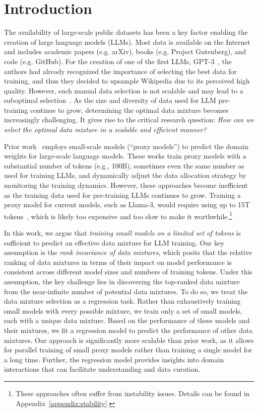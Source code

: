 \section{Introduction}

The availability of large-scale public datasets has been a key factor enabling the creation of large language models (LLMs). Most data is available on the Internet and includes academic papers (e.g. arXiv), books (e.g. Project Gutenberg), and code (e.g. GitHub). For the creation of one of the first LLMs, GPT-3~\citep{gpt3paper}, the authors had already recognized the importance of selecting the best data for training, and thus they decided to upsample Wikipedia due to its perceived high quality. However, such manual data selection is not scalable and may lead to a suboptimal selection~\citep{albalak2024survey}.
As the size and diversity of data used for LLM pre-training continue to grow, determining the optimal data mixture becomes increasingly challenging.
It gives rise to the critical research question: \textit{How can we select the optimal data mixture in a scalable and efficient manner?} 

Prior work~\citep{xie2023doremi,fan2023doge,albalak2023efficient} employs small-scale models (``proxy models'') to predict the domain weights for large-scale language models. These works train proxy models with a substantial number of tokens (e.g., 100B), sometimes even the same number as used for training LLMs, and dynamically adjust the data allocation strategy by monitoring the training dynamics. However, these approaches become inefficient as the training data used for pre-training LLMs continues to grow.
Training a proxy model for current models, such as Llama-3, would require using up to 15T tokens~\citep{meta_llama_3_2024}, which is likely too expensive and too slow to make it worthwhile.\footnote{These approaches often suffer from instability issues. Details can be found in Appendix~\ref{appendix:stability}.}


In this work, we argue that \textit{training small models on a limited set of tokens} is sufficient to predict an effective data mixture for LLM training. Our key assumption is the \textit{rank invariance of data mixtures}, which posits that the relative ranking of data mixtures in terms of their impact on model performance is consistent across different model sizes and numbers of training tokens. Under this assumption, the key challenge lies in discovering the top-ranked data mixture from the near-infinite number of potential data mixtures. To do so, we treat the data mixture selection as a regression task. Rather than exhaustively training small models with every possible mixture, we train only a set of small models, each with a unique data mixture. Based on the performance of these models and their mixtures, we fit a regression model to predict the performance of other data mixtures. Our approach is significantly more scalable than prior work, as it allows for parallel training of small proxy models rather than training a single model for a long time. Further, the regression model provides insights into domain interactions that can facilitate understanding and data curation. 


